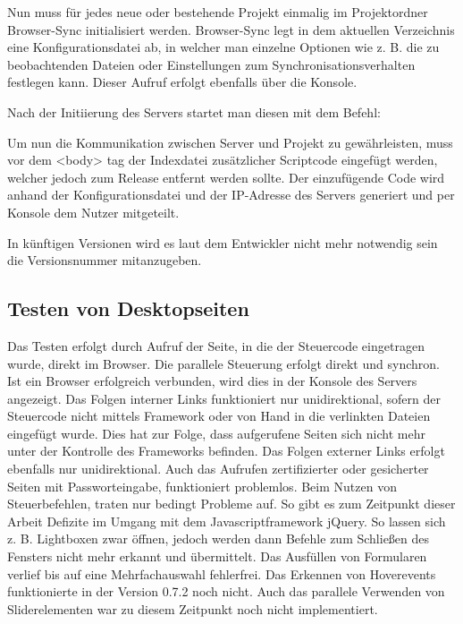 	Nun muss für jedes neue oder bestehende Projekt einmalig im Projektordner Browser-Sync initialisiert werden. Browser-Sync legt in dem aktuellen Verzeichnis eine Konfigurationsdatei ab, in welcher man einzelne Optionen wie z. B. die zu beobachtenden Dateien oder Einstellungen zum Synchronisationsverhalten festlegen kann. Dieser Aufruf erfolgt ebenfalls über die Konsole.
	
	Nach der Initiierung des Servers startet man diesen mit dem Befehl:
	
	Um nun die Kommunikation zwischen Server und Projekt zu gewährleisten, muss vor dem <body> tag der Indexdatei zusätzlicher Scriptcode eingefügt werden, welcher jedoch zum Release entfernt werden sollte. Der einzufügende Code  wird anhand der Konfigurationsdatei und der IP-Adresse des Servers generiert und per Konsole dem Nutzer mitgeteilt.
	
	In künftigen Versionen wird es laut dem Entwickler nicht mehr notwendig sein die Versionsnummer mitanzugeben.
	
	\subsection{Testen von Desktopseiten}
	Das Testen erfolgt durch Aufruf der Seite, in die der Steuercode eingetragen wurde, direkt im Browser. Die parallele Steuerung erfolgt direkt und synchron. Ist ein Browser erfolgreich verbunden, wird dies in der Konsole des Servers angezeigt.
	Das Folgen interner Links funktioniert nur unidirektional, sofern der Steuercode nicht mittels \Gls{Framework} oder von Hand in die verlinkten Dateien eingefügt wurde. Dies hat zur Folge, dass aufgerufene Seiten sich nicht mehr unter der Kontrolle des \Gls{Framework}s befinden. Das Folgen externer Links erfolgt ebenfalls nur unidirektional. Auch das Aufrufen zertifizierter oder \gls{gesichert}er Seiten mit Passworteingabe, funktioniert problemlos. Beim Nutzen von Steuerbefehlen, traten nur bedingt Probleme auf. So gibt es zum Zeitpunkt dieser Arbeit Defizite im Umgang mit dem \Gls{Javascript}framework jQuery. So lassen sich z. B. Lightboxen zwar öffnen, jedoch werden dann Befehle zum \mbox{Schließen} des Fensters nicht mehr erkannt und übermittelt. Das Ausfüllen von Formularen verlief bis auf eine Mehrfachauswahl fehlerfrei. Das Erkennen von Hoverevents funktionierte in der Version 0.7.2 noch nicht. Auch das parallele Verwenden von Sliderelementen war zu diesem Zeitpunkt noch nicht implementiert.
	
